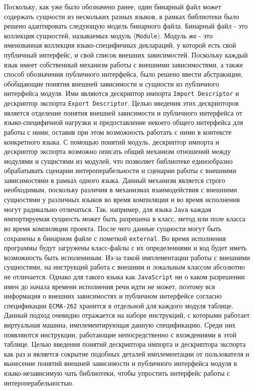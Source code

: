 Поскольку, как уже было обозначено ранее, один бинарный файл может содержать сущности из нескольких разных языков, в рамках библиотеки было решено адаптировать следующую модель бинарного файла. Бинарный файл - это коллекция сущностей, называемых модуль (\texttt{Module}). Модуль же - это именованная коллекция языко-специфичных деклараций, у которой есть свой публичный интерфейс, и свой список внешних зависимостей. Поскольку каждый язык имеет собственный механизм работы с внешними зависимостями, а также способ обозначения публичного интерфейса, было решено ввести абстракиции, обобщающие понятия внешней зависимости и сущности из публичного интерфейса модуля. Ими являются дескриптор импорта \texttt{Import~Descriptor} и дескриптор экспорта \texttt{Export~Descriptor}. Целью введения этих дескрипторов является отделение понятия внешней зависимости и публичного интерфейса от языко-специфичной нагрузки и предоставление некоего общего интерфейса для работы с ними, оставив при этом возможность работать с ними в контексте конкретного языка. С помощью понятий модуль, дескриптор импорта и дескриптор экспорта возможно описать общий механизм отношений между модулями и сущнстями из модулей, что позволяет библиотеке единообразно обрабатывать сценарии интероперабельности и сценарии работы с внешними зависимостями в рамках одного языка. Данный механизм является строго необходимым, поскольку различия в механизмах взаимодействия с внешними сущностями у различных языков во время компиляции и во время исполнения могут радикально отличаться. Так, например, для языка \texttt{Java} каждая импортируемая сущность может быть разрешена в класс, метод или поле класса во время компиляции проекта. После чего данные сущности могут быть сохранены в бинарном файле с пометкой \texttt{external}. Во время исполнения программы будут загружены класс-файлы с их определениями и код будет иметь возможность быть исполеннным. Из-за такой имплементации работы с внешними сущностями, на инструкций работа с внешним и локальным классом абсолютно не отличается. Однако для такого языка как \texttt{JavaScript} ни о каком разрешении имен до начала времени исполнения речи идти не может, поэтому вся информация о внешних зависимостях и публичном интерфейсе согласно спецификации \texttt{ECMA-262} хранится в отдельной для каждого модуля таблице. Данный подход очевидно отражается на наборе инструкций, с которыми работает виртуальная машина, имплементирующая данную спецификацию. Среди них появляются инструкции, работающие непосредственно с вхождениями в этой таблице. Целью введения понятий дескриптора импорта и дескриптора экспорта как раз и является сокрытие подобных деталей имплементации от пользователя и вынесение понятий внешней зависимости и публичного интерфейса модуля в языко-независимую чать библиотеки, чтобы упростить интерфейс работы с интероперабельностью.


